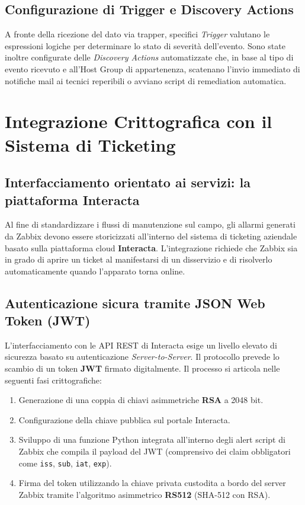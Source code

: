 \documentclass[12pt, a4paper]{report}
\begin{document}
\section{Configurazione di Trigger e Discovery Actions}
A fronte della ricezione del dato via trapper, specifici \textit{Trigger} valutano le espressioni logiche per determinare lo stato di severit\`a dell'evento. Sono state inoltre configurate delle \textit{Discovery Actions} automatizzate che, in base al tipo di evento ricevuto e all'Host Group di appartenenza, scatenano l'invio immediato di notifiche mail ai tecnici reperibili o avviano script di remediation automatica.

\clearpage

\chapter{Integrazione Crittografica con il Sistema di Ticketing}
\section{Interfacciamento orientato ai servizi: la piattaforma Interacta}
Al fine di standardizzare i flussi di manutenzione sul campo, gli allarmi generati da Zabbix devono essere storicizzati all'interno del sistema di ticketing aziendale basato sulla piattaforma cloud \textbf{Interacta}. L'integrazione richiede che Zabbix sia in grado di aprire un ticket al manifestarsi di un disservizio e di risolverlo automaticamente quando l'apparato torna online.

\section{Autenticazione sicura tramite JSON Web Token (JWT)}
L'interfacciamento con le API REST di Interacta esige un livello elevato di sicurezza basato su autenticazione \textit{Server-to-Server}. Il protocollo prevede lo scambio di un token \textbf{JWT} firmato digitalmente. Il processo si articola nelle seguenti fasi crittografiche:
\begin{enumerate}
    \item Generazione di una coppia di chiavi asimmetriche \textbf{RSA} a 2048 bit.
    \item Configurazione della chiave pubblica sul portale Interacta.
    \item Sviluppo di una funzione Python integrata all'interno degli alert script di Zabbix che compila il payload del JWT (comprensivo dei claim obbligatori come \texttt{iss}, \texttt{sub}, \texttt{iat}, \texttt{exp}).
    \item Firma del token utilizzando la chiave privata custodita a bordo del server Zabbix tramite l'algoritmo asimmetrico \textbf{RS512} (SHA-512 con RSA).
\end{enumerate}
\end{document}
